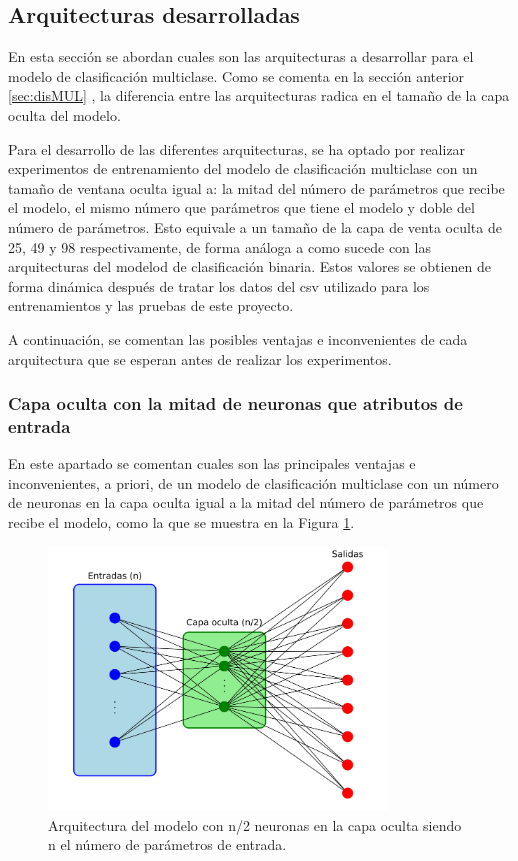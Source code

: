 \subsection{Arquitecturas desarrolladas}
En esta sección se abordan cuales son las arquitecturas a desarrollar para el modelo de clasificación multiclase. Como se comenta en la sección anterior \ref{sec:disMUL} , la diferencia entre las arquitecturas radica en el tamaño de la capa oculta del modelo.

Para el desarrollo de las diferentes arquitecturas, se ha optado por realizar experimentos de entrenamiento del modelo de clasificación multiclase con un tamaño de ventana oculta igual a:
la mitad del número de parámetros que recibe el modelo, el mismo número que parámetros que tiene el modelo y doble del número de parámetros. Esto equivale a un tamaño de la capa de venta oculta de 25, 49 y 98 respectivamente, de forma análoga a como sucede con las arquitecturas del modelod de clasificación binaria. Estos valores se obtienen de forma dinámica después de tratar los datos del csv utilizado para los entrenamientos y las pruebas de este proyecto.

A continuación, se comentan las posibles ventajas e inconvenientes de cada arquitectura que se esperan antes de realizar los experimentos.

\subsubsection{Capa oculta con la mitad de neuronas que atributos de entrada}\label{sec:VIMUL25}
En este apartado se comentan cuales son las principales ventajas e inconvenientes, a priori, de un modelo de clasificación multiclase con un número de neuronas en la capa oculta igual a la mitad del número de parámetros que recibe el modelo, como la que se muestra en la Figura \ref{fig:arqnmediosMUL}.

\begin{figure}[H]
    \centering
    \includegraphics[width=0.8\textwidth]{./img/modelo/arqnmediosMUL.pdf}
    \caption{Arquitectura del modelo con n/2 neuronas en la capa oculta siendo n el número de parámetros de entrada.}
    \label{fig:arqnmediosMUL}
\end{figure}

